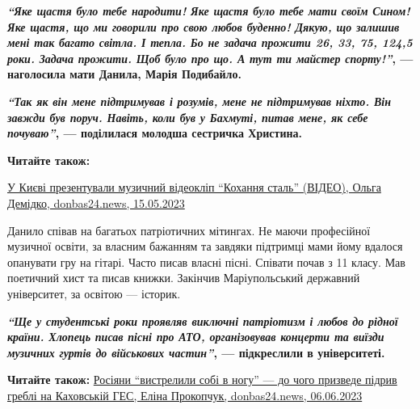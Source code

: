 \begin{leftbar}
	\begingroup
		\bfseries
{\color{blue}\em\enquote{Яке щастя було тебе народити! Яке щастя було тебе мати своїм Сином!  Яке
щастя, що ми говорили про свою любов буденно! Дякую, що залишив мені
так багато світла. І тепла. Бо не задача прожити 26, 33, 75, 124,5
роки. Задача прожити. Щоб було про що. А тут ти майстер спорту!}}, —
наголосила мати Данила, Марія Подибайло. 
	\endgroup
\end{leftbar}

\begin{leftbar}
	\begingroup
		\bfseries
{\color{blue}\em\enquote{Так як він мене підтримував і розумів, мене не підтримував ніхто. Він завжди
був поруч. Навіть, коли був у Бахмуті, питав мене, як себе почуваю}}, —
поділилася молодша сестричка Христина. 
	\endgroup
\end{leftbar}


\textbf{Читайте також:} 

\href{https://donbas24.news/news/u-kijevi-prezentuvali-muzicnii-videoklip-koxannya-stal}{%
У Києві презентували музичний відеокліп \enquote{Кохання сталь} (ВІДЕО), Ольга Демідко, donbas24.news, 15.05.2023}

Данило співав на багатьох патріотичних мітингах. Не маючи професійної музичної
освіти, за власним бажанням та завдяки підтримці мами йому вдалося опанувати
гру на гітарі. Часто писав власні пісні. Співати почав з 11 класу. Мав
поетичний хист та писав книжки. Закінчив Маріупольський державний університет,
за освітою — історик.

\begin{leftbar}
	\begingroup
		\bfseries
{\color{blue}\em\enquote{Ще у студентські роки проявляв виключні патріотизм і любов до рідної
країни. Хлопець писав пісні про АТО, організовував концерти та виїзди
музичних гуртів до військових частин}}, — підкреслили в університеті.
	\endgroup
\end{leftbar}



\textbf{Читайте також:} \href{https://donbas24.news/news/rosiyani-vistrelili-sobi-v-nogu-do-cogo-prizvede-pidriv-grebli-na-kaxovskii-ges}{%
Росіяни \enquote{вистрелили собі в ногу} — до чого призведе підрив греблі на Каховській ГЕС, Еліна Прокопчук, donbas24.news, 06.06.2023}


